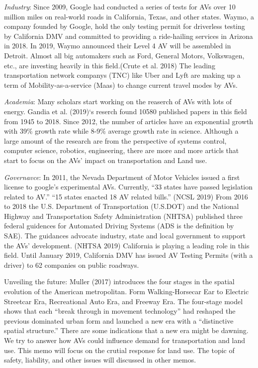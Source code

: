 \documentclass[12pt,]{article}
\begin{document}
\emph{Industry}: Since 2009, Google had conducted a series of tests for
AVs over 10 million miles on real-world roads in California, Texas, and
other states. Waymo, a company founded by Google, hold the only testing
permit for driverless testing by California DMV and committed to
providing a ride-hailing services in Arizona in 2018. In 2019, Waymo
announced their Level 4 AV will be assembled in Detroit. Almost all big
automakers such as Ford, General Motors, Volkswagen, etc., are investing
heavily in this field.(Crute et al. 2018) The leading transportation
network companys (TNC) like Uber and Lyft are making up a term of
Mobility-as-a-service (Maas) to change current travel modes by AVs.

\emph{Academia}: Many scholars start working on the reaserch of AVs with
lots of energy. Gandia et al. (2019)`s reserch found 10580 published
papers in this field from 1945 to 2018. Since 2012, the number of
articles have an exponential growth with 39\% growth rate while 8-9\%
average growth rate in science. Although a large amount of the research
are from the perspective of systems control, computer science, robotics,
engineering, there are more and more articls that start to focus on the
AVs' impact on transportation and Land use.

\emph{Governavce}: In 2011, the Nevada Department of Motor Vehicles
issued a first license to google's experimental AVs. Currently, ``33
states have passed legislation related to AV.'' ``15 states enacted 18
AV related bills.'' (NCSL 2019) From 2016 to 2018 the U.S. Department of
Transportation (U.S.DOT) and the National Highway and Transportation
Safety Administration (NHTSA) published three federal guidences for
Automated Driving Systems (ADS is the definition by SAE). The guidances
advocate industry, state and local government to support the AVs'
development. (NHTSA 2019) California is playing a leading role in this
field. Until January 2019, California DMV has issued AV Testing Permits
(with a driver) to 62 companies on public roadways.

Unveiling the future: Muller (2017) introduces the four stages in the
spatial evolution of the American metropolitan. Form Walking-Horsecar
Ear to Electric Streetcar Era, Recreational Auto Era, and Freeway Era.
The four-stage model shows that each ``break through in movement
technology'' had reshaped the previous dominated urban form and launched
a new era with a ``distinctive spatial structure.'' There are some
indications that a new era might be dawning. We try to answer how AVs
could influence demand for transportation and land use. This memo will
focus on the crutial response for land use. The topic of safety,
liability, and other issues will discussed in other memos.
\end{document}
